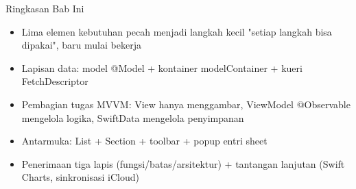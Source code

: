 \begin{tcbsummary}{Ringkasan Bab Ini}
\begin{itemize}
  \item Lima elemen kebutuhan pecah menjadi langkah kecil "setiap langkah bisa dipakai", baru mulai bekerja
  \item Lapisan data: model @Model + kontainer modelContainer + kueri FetchDescriptor
  \item Pembagian tugas MVVM: View hanya menggambar, ViewModel @Observable mengelola logika, SwiftData mengelola penyimpanan
  \item Antarmuka: List + Section + toolbar + popup entri sheet
  \item Penerimaan tiga lapis (fungsi/batas/arsitektur) + tantangan lanjutan (Swift Charts, sinkronisasi iCloud)
\end{itemize}

\end{tcbsummary}
